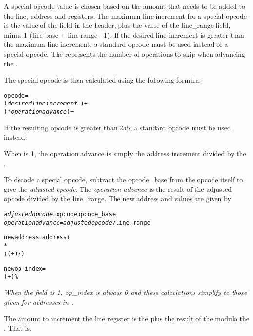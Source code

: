 A special opcode value is chosen based on the amount that needs
to be added to the line, address and  registers.
The
maximum line increment for a special opcode is the value
of the 
field in the header, plus the value of
the line\_range field, minus 1 (line base + 
line range - 1). 
If the desired line increment is greater than the maximum
line increment, a standard opcode must be used instead of a
special opcode. The  represents the number
of operations to skip when advancing the .

The special opcode is then calculated using the following formula:
\begin{alltt}
  opcode = 
    (\textit{desired line increment} - ) +
      ( * \textit{operation advance}) + 
\end{alltt}
If the resulting opcode is greater than 255, a standard opcode
must be used instead.

When  is 1, the operation
advance is simply the address increment divided by the
.

To decode a special opcode, subtract the opcode\_base from
the opcode itself to give the \textit{adjusted opcode}. 
The \textit{operation advance} 
is the result of the adjusted opcode divided by the
line\_range. The new address and  values
are given by
\begin{alltt}
  \textit{adjusted opcode} = opcode \dash opcode\_base
  \textit{operation advance} = \textit{adjusted opcode} / line\_range

  new address = address +
     *
      (( + ) / )

  new op\_index =
    ( + ) \% 
\end{alltt}

\textit{When the  field is 1,
op\_index is always 0 and these calculations simplify to those
given for addresses in 
.}

The amount to increment the line register is the 
 plus
the result of the 
 modulo the 
. That
is,

